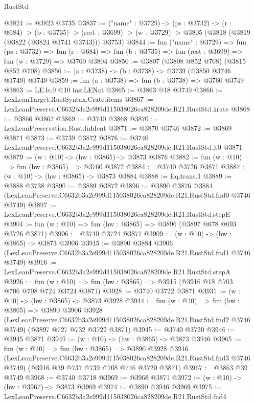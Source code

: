\begin{lexlean}{RustStd}
\begin{coremodule}
@3824 := @3823 @3735
@3837 := ("name" : @3729) ->
  (ps : @3732) ->
  (r : @684) ->
  (b : @3735) ->
  (rest : @3699) -> (w : @3729) -> @3805 (@3818 (@3819 (@3822 (@3824 @3741 @3743))) @3753)
@3844 := fun ("name" : @3729) =>
  fun (ps : @3732) =>
  fun (r : @684) => fun (b : @3735) => fun (rest : @3699) => fun (w : @3729) => @3760 @3804
@3850 := @3807 (@3808 @852 @708) (@3815 @852 @708)
@3856 := (a : @3738) -> (b : @3738) -> @3739 (@3850 @3746 @3749) @3749
@3859 := fun (a : @3738) => fun (b : @3738) => @3760 @3749
@3863 := LE.le.{0} @10 instLENat
@3865 := @3863 @18 @3749
@3866 := LexLeanTarget.RustSyntax.Crate.items
@3867 := LexLeanPreserve.C6632b3a2e999d115038026ca828209de.R21.RustStd.krate
@3868 := @3866 @3867
@3869 := @3740 @3868
@3870 := LexLeanPreservation.Rust.fnIdent
@3871 := @3870 @3746
@3872 := @3869 @3871
@3873 := @3739 @3872
@3876 := @3740 LexLeanPreserve.C6632b3a2e999d115038026ca828209de.R21.RustStd.it0 @3871
@3879 := (w : @10) -> (hw : @3865) -> @3873 @3876
@3882 := fun (w : @10) => fun (hw : @3865) => @3760 @3872
@3884 := @3740 @3726 @3871
@3887 := (w : @10) -> (hw : @3865) -> @3873 @3884
@3888 := Eq.trans.{1}
@3889 := @3888 @3738
@3890 := @3889 @3872
@3896 := @3890
    @3876
    @3884
    (LexLeanPreserve.C6632b3a2e999d115038026ca828209de.R21.RustStd.fnd0 @3746 @3749)
@3897 := LexLeanPreserve.C6632b3a2e999d115038026ca828209de.R21.RustStd.stepE
@3904 := fun (w : @10) => fun (hw : @3865) => @3896 (@3897 @678 @693 @3726 @3871)
@3906 := @3740 @3724 @3871
@3909 := (w : @10) -> (hw : @3865) -> @3873 @3906
@3915 := @3890
    @3884
    @3906
    (LexLeanPreserve.C6632b3a2e999d115038026ca828209de.R21.RustStd.fnd1 @3746 @3749)
@3916 := LexLeanPreserve.C6632b3a2e999d115038026ca828209de.R21.RustStd.stepA
@3926 := fun (w : @10) => fun (hw : @3865) => @3915 (@3916 @18 @703 @706 @708 @724 @3724 @3871)
@3928 := @3740 @3722 @3871
@3931 := (w : @10) -> (hw : @3865) -> @3873 @3928
@3944 := fun (w : @10) =>
  fun (hw : @3865) =>
  @3890
    @3906
    @3928
    (LexLeanPreserve.C6632b3a2e999d115038026ca828209de.R21.RustStd.fnd2 @3746 @3749)
    (@3897 @727 @732 @3722 @3871)
@3945 := @3740 @3720
@3946 := @3945 @3871
@3949 := (w : @10) -> (hw : @3865) -> @3873 @3946
@3965 := fun (w : @10) =>
  fun (hw : @3865) =>
  @3890
    @3928
    @3946
    (LexLeanPreserve.C6632b3a2e999d115038026ca828209de.R21.RustStd.fnd3 @3746 @3749)
    (@3916 @39 @737 @739 @708 @746 @3720 @3871)
@3967 := @3863 @39 @3749
@3968 := @3740 @3718
@3969 := @3968 @3871
@3972 := (w : @10) -> (hw : @3967) -> @3873 @3969
@3974 := @3890 @3946 @3969
@3975 := LexLeanPreserve.C6632b3a2e999d115038026ca828209de.R21.RustStd.fnd4

\end{coremodule}
\end{lexlean}
